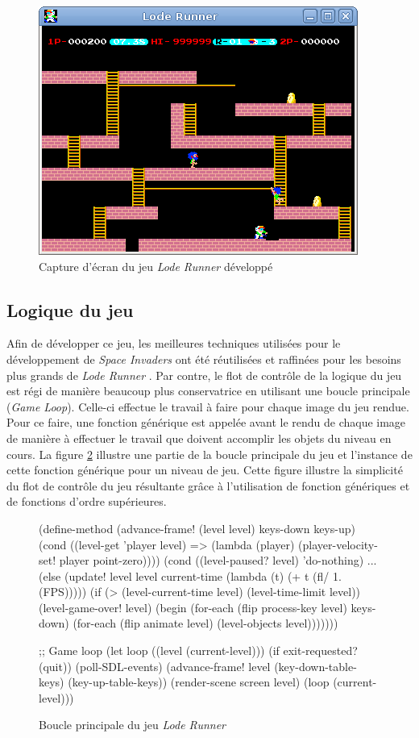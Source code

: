 \documentclass[12pt,twoside,letterpaper,francais]{book}
\newcommand{\lr}{{\textit{Lode Runner }}}
\newcommand{\si}{{\textit{Space Invaders }}}
\newcommand{\scheme}[1]{\selectlanguage{english}{\tt #1}\selectlanguage{french}}
\begin{document}
\begin{figure}[htb!]
  \center
  \includegraphics[scale=0.6]{lode-runner-screenshot}
  \caption{Capture d'écran du jeu \lr développé}
  \label{Exp:ld-screen}
\end{figure}


\FloatBarrier
\subsection{Logique du jeu}
Afin de développer ce jeu, les meilleures techniques utilisées pour le
développement de \si ont été réutilisées et raffinées pour les besoins
plus grands de \lr. Par contre, le flot de contrôle de la logique du
jeu est régi de manière beaucoup plus conservatrice en utilisant une
boucle principale (\textit{Game Loop}). Celle-ci effectue le travail à
faire pour chaque image du jeu rendue. Pour ce faire, une fonction
générique \scheme{advance-frame!} est appelée avant le rendu de chaque
image de manière à effectuer le travail que doivent accomplir les
objets du niveau en cours. La figure \ref{Exp:lr-main} illustre une
partie de la boucle principale du jeu et l'instance de cette fonction
générique pour un niveau de jeu. Cette figure illustre la simplicité
du flot de contrôle du jeu résultante grâce à l'utilisation de
fonction génériques et de fonctions d'ordre supérieures.\\

\begin{figure}[htb!]
  \begin{schemecode}
(define-method (advance-frame! (level level) keys-down keys-up)
  (cond ((level-get 'player level) =>
         (lambda (player)
           (player-velocity-set! player point-zero))))
  (cond
   ((level-paused? level) 'do-nothing)
   ...
   (else
    (update! level level current-time (lambda (t) (+ t (fl/ 1. (FPS)))))
    (if (> (level-current-time level) (level-time-limit level))
        (level-game-over! level)
        (begin
          (for-each (flip process-key level) keys-down)
          (for-each (flip animate level) (level-objects level)))))))

;; Game loop
(let loop ((level (current-level)))
  (if exit-requested? (quit))
  (poll-SDL-events)
  (advance-frame! level (key-down-table-keys) (key-up-table-keys))
  (render-scene screen level)
  (loop (current-level)))
  \end{schemecode}
  \caption{Boucle principale du jeu \lr}
  \label{Exp:lr-main}
\end{figure}
\end{document}
